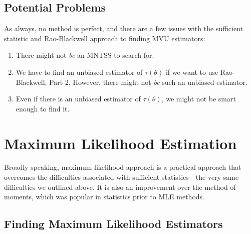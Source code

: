\documentclass[a4paper,12pt]{scrartcl}
\begin{document}
\subsection{Potential Problems}

As always, no method is perfect, and there are a few issues with 
the sufficient statistic and Rao-Blackwell approach to finding 
MVU estimators:
\begin{enumerate}
   \item There might not \emph{be} an MNTSS to search for.
   \item We have to find an unbiased estimator of $\tau(\theta)$ if
      we want to use Rao-Blackwell, Part 2. However, there might
      not \emph{be} such an unbiased estimator.
   \item Even if there is an unbiased estimator of $\tau(\theta)$,
      we might not be smart enough to find it.
\end{enumerate}




\newpage

\section{Maximum Likelihood Estimation}

Broadly speaking, maximum likelihood approach is a practical approach
that overcomes the difficulties associated with sufficient 
statistics---the very same difficulties we outlined above. It is also
an improvement over the method of moments, which was popular in
statistics prior to MLE methods.

\subsection{Finding Maximum Likelihood Estimators}
\end{document}
